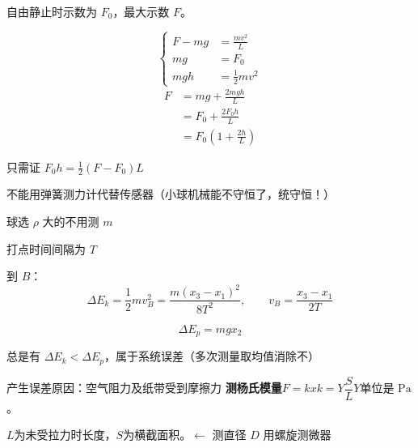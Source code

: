 
自由静止时示数为 $F_0$，最大示数 $F$。

\[
\left\{\begin{aligned}
F-mg&=\frac{mv^2}{L}\\
mg&=F_0\\
mgh&=\tfrac12 mv^2
\end{aligned}\right.
\]
\begin{align*}
F&=mg+\frac{2mgh}{L}\\
&=F_0+\frac{2F_0h}{L}\\
&=F_0\left(1+\frac{2h}{L}\right)
\end{align*}

\begin{keybox}
只需证 $F_0h=\frac12(F-F_0)L$ %
\end{keybox}

不能用弹簧测力计代替传感器（小球机械能不守恒了，统守恒！）

球选 $\rho$ 大的\quad 不用测 $m$

打点时间间隔为 $T$

到 $B$：
\[ \Delta E_k=\frac12 mv_B^2=\frac{m(x_3-x_1)^2}{8T^2},\qquad v_B=\frac{x_3-x_1}{2T} \]


\[ \Delta E_p=mgx_2 \]

总是有 $\Delta E_k<\Delta E_p$，属于系统误差（多次测量取均值消除不）

产生误差原因：空气阻力及纸带受到摩擦力
\textbf{测杨氏模量}\quad $F=kx$\quad $k=Y\dfrac{S}{L}$\quad $Y$单位是 $\mathrm{Pa}$。

$L$为未受拉力时长度，$S$为横截面积。$\leftarrow$ 测直径 $D$ 用螺旋测微器 %

